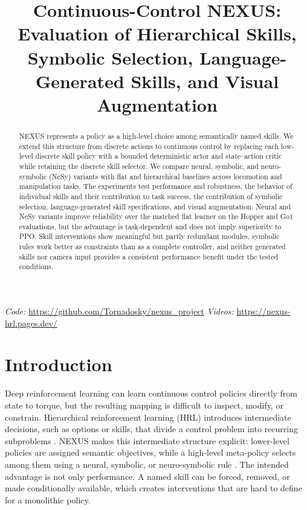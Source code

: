 \documentclass[conference,letterpaper,10pt]{IEEEtran}
\title{Continuous-Control NEXUS:\\
Evaluation of Hierarchical Skills, Symbolic Selection, Language-Generated Skills, and Visual Augmentation}
\author{\IEEEauthorblockN{Ivan Smirnov, Maryana Smirnova, Rosela Berberi, Anja Koroveshi}
\IEEEauthorblockA{Technical University of Darmstadt}}
\begin{document}
\maketitle

\begin{abstract}
NEXUS represents a policy as a high-level choice among semantically named skills. We extend this structure from discrete actions to continuous control by replacing each low-level discrete skill policy with a bounded deterministic actor and state--action critic while retaining the discrete skill selector. We compare neural, symbolic, and neuro-symbolic (NeSy) variants with flat and hierarchical baselines across locomotion and manipulation tasks. The experiments test performance and robustness, the behavior of individual skills and their contribution to task success, the contribution of symbolic selection, language-generated skill specifications, and visual augmentation. Neural and NeSy variants improve reliability over the matched flat learner on the Hopper and Go1 evaluations, but the advantage is task-dependent and does not imply superiority to PPO. Skill interventions show meaningful but partly redundant modules, symbolic rules work better as constraints than as a complete controller, and neither generated skills nor camera input provides a consistent performance benefit under the tested conditions.
\end{abstract}

\vspace{2pt}
\noindent\textit{Code:} \url{https://github.com/Tornadosky/nexus_project}\hfill
\textit{Videos:} \url{https://nexus-hrl.pages.dev/}
\vspace{3pt}

\section{Introduction}
Deep reinforcement learning can learn continuous control policies directly from state to torque, but the resulting mapping is difficult to inspect, modify, or constrain. Hierarchical reinforcement learning (HRL) introduces intermediate decisions, such as options or skills, that divide a control problem into recurring subproblems \cite{sutton1999,bacon2017}. NEXUS makes this intermediate structure explicit: lower-level policies are assigned semantic objectives, while a high-level meta-policy selects among them using a neural, symbolic, or neuro-symbolic rule \cite{nexus}. The intended advantage is not only performance. A named skill can be forced, removed, or made conditionally available, which creates interventions that are hard to define for a monolithic policy.
\end{document}
